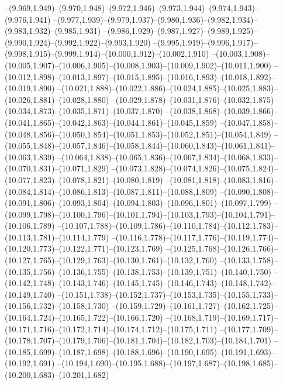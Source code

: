  --(9.969,1.949)--(9.970,1.948)--(9.972,1.946)--(9.973,1.944)--(9.974,1.943)--(9.976,1.941)%
  --(9.977,1.939)--(9.979,1.937)--(9.980,1.936)--(9.982,1.934)--(9.983,1.932)--(9.985,1.931)%
  --(9.986,1.929)--(9.987,1.927)--(9.989,1.925)--(9.990,1.924)--(9.992,1.922)--(9.993,1.920)%
  --(9.995,1.919)--(9.996,1.917)--(9.998,1.915)--(9.999,1.914)--(10.000,1.912)--(10.002,1.910)%
  --(10.003,1.908)--(10.005,1.907)--(10.006,1.905)--(10.008,1.903)--(10.009,1.902)--(10.011,1.900)%
  --(10.012,1.898)--(10.013,1.897)--(10.015,1.895)--(10.016,1.893)--(10.018,1.892)--(10.019,1.890)%
  --(10.021,1.888)--(10.022,1.886)--(10.024,1.885)--(10.025,1.883)--(10.026,1.881)--(10.028,1.880)%
  --(10.029,1.878)--(10.031,1.876)--(10.032,1.875)--(10.034,1.873)--(10.035,1.871)--(10.037,1.870)%
  --(10.038,1.868)--(10.039,1.866)--(10.041,1.865)--(10.042,1.863)--(10.044,1.861)--(10.045,1.859)%
  --(10.047,1.858)--(10.048,1.856)--(10.050,1.854)--(10.051,1.853)--(10.052,1.851)--(10.054,1.849)%
  --(10.055,1.848)--(10.057,1.846)--(10.058,1.844)--(10.060,1.843)--(10.061,1.841)--(10.063,1.839)%
  --(10.064,1.838)--(10.065,1.836)--(10.067,1.834)--(10.068,1.833)--(10.070,1.831)--(10.071,1.829)%
  --(10.073,1.828)--(10.074,1.826)--(10.075,1.824)--(10.077,1.823)--(10.078,1.821)--(10.080,1.819)%
  --(10.081,1.818)--(10.083,1.816)--(10.084,1.814)--(10.086,1.813)--(10.087,1.811)--(10.088,1.809)%
  --(10.090,1.808)--(10.091,1.806)--(10.093,1.804)--(10.094,1.803)--(10.096,1.801)--(10.097,1.799)%
  --(10.099,1.798)--(10.100,1.796)--(10.101,1.794)--(10.103,1.793)--(10.104,1.791)--(10.106,1.789)%
  --(10.107,1.788)--(10.109,1.786)--(10.110,1.784)--(10.112,1.783)--(10.113,1.781)--(10.114,1.779)%
  --(10.116,1.778)--(10.117,1.776)--(10.119,1.774)--(10.120,1.773)--(10.122,1.771)--(10.123,1.769)%
  --(10.125,1.768)--(10.126,1.766)--(10.127,1.765)--(10.129,1.763)--(10.130,1.761)--(10.132,1.760)%
  --(10.133,1.758)--(10.135,1.756)--(10.136,1.755)--(10.138,1.753)--(10.139,1.751)--(10.140,1.750)%
  --(10.142,1.748)--(10.143,1.746)--(10.145,1.745)--(10.146,1.743)--(10.148,1.742)--(10.149,1.740)%
  --(10.151,1.738)--(10.152,1.737)--(10.153,1.735)--(10.155,1.733)--(10.156,1.732)--(10.158,1.730)%
  --(10.159,1.729)--(10.161,1.727)--(10.162,1.725)--(10.164,1.724)--(10.165,1.722)--(10.166,1.720)%
  --(10.168,1.719)--(10.169,1.717)--(10.171,1.716)--(10.172,1.714)--(10.174,1.712)--(10.175,1.711)%
  --(10.177,1.709)--(10.178,1.707)--(10.179,1.706)--(10.181,1.704)--(10.182,1.703)--(10.184,1.701)%
  --(10.185,1.699)--(10.187,1.698)--(10.188,1.696)--(10.190,1.695)--(10.191,1.693)--(10.192,1.691)%
  --(10.194,1.690)--(10.195,1.688)--(10.197,1.687)--(10.198,1.685)--(10.200,1.683)--(10.201,1.682)%
